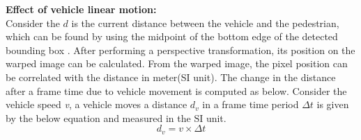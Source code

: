 







\textbf{Effect of vehicle linear motion:} \\
Consider the $d$ is the current distance between the vehicle and the pedestrian, which can be found by using the midpoint of the bottom edge of the detected bounding box \cite{CarND-Advanced-Lane}. After performing a perspective transformation, its position on the warped image can be calculated. From the warped image, the pixel position can be correlated with the distance in meter(SI unit). The change in the distance after a frame time due to vehicle movement is computed as below. Consider the vehicle speed \textit{v}, a vehicle moves a distance $d_v$ in a frame time period $\Delta t$ is given by the below equation and measured in the SI unit.
\begin{equation} \label{distance-in-pixel}
{d_v}= v \times \Delta t
\end{equation} 


